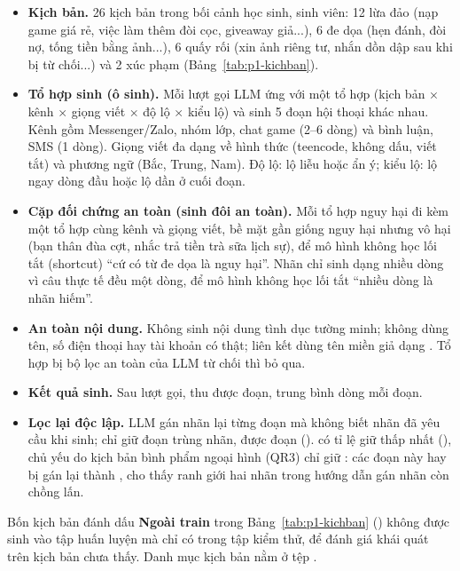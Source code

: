 \begin{itemize}
  \item \textbf{Kịch bản.} 26 kịch bản trong bối cảnh học sinh, sinh viên: 12 lừa đảo (nạp game giá
        rẻ, việc làm thêm đòi cọc, giveaway giả...), 6 đe dọa (hẹn đánh, đòi nợ, tống tiền bằng ảnh...),
        6 quấy rối (xin ảnh riêng tư, nhắn dồn dập sau khi bị từ chối...) và 2 xúc phạm
        (Bảng~\ref{tab:p1-kichban}).
  \item \textbf{Tổ hợp sinh (ô sinh).} Mỗi lượt gọi LLM ứng với một tổ hợp (kịch bản $\times$ kênh $\times$ giọng viết
        $\times$ độ lộ $\times$ kiểu lộ) và sinh 5 đoạn hội thoại khác nhau. Kênh gồm Messenger/Zalo, nhóm lớp,
        chat game (2--6 dòng) và bình luận, SMS (1 dòng). Giọng viết đa dạng về hình thức (teencode, không dấu, viết
        tắt) và phương ngữ (Bắc, Trung, Nam). Độ lộ: lộ liễu hoặc ẩn ý; kiểu lộ: lộ ngay dòng đầu hoặc lộ dần
        ở cuối đoạn.
  \item \textbf{Cặp đối chứng an toàn (sinh đôi an toàn).} Mỗi tổ hợp nguy hại đi kèm một tổ hợp  cùng
        kênh và giọng viết, bề mặt gần giống nguy hại nhưng vô hại (bạn thân đùa cợt, nhắc trả
        tiền trà sữa lịch sự), để mô hình không học lối tắt (shortcut) ``cứ có từ đe dọa là nguy hại''. Nhãn
         chỉ sinh dạng nhiều dòng vì câu  thực tế đều một dòng, để mô hình
        không học lối tắt ``nhiều dòng là nhãn hiếm''.
  \item \textbf{An toàn nội dung.} Không sinh nội dung tình dục tường minh; không dùng tên, số điện thoại hay tài khoản
        có thật; liên kết dùng tên miền giả dạng . Tổ hợp bị bộ lọc an toàn của LLM từ chối
        thì bỏ qua.
  \item \textbf{Kết quả sinh.} Sau  lượt gọi, thu được  đoạn, trung
        bình  dòng mỗi đoạn.
  \item \textbf{Lọc lại độc lập.} LLM gán nhãn lại từng đoạn mà không biết nhãn đã yêu cầu khi sinh; chỉ giữ
        đoạn trùng nhãn, được  đoạn ().  có tỉ lệ giữ thấp
        nhất (), chủ yếu do kịch bản bình phẩm ngoại hình (QR3) chỉ giữ :
        các đoạn này hay bị gán lại thành , cho thấy ranh giới hai nhãn trong hướng
        dẫn gán nhãn còn chồng lấn.
\end{itemize}

Bốn kịch bản đánh dấu \textbf{Ngoài train} trong Bảng~\ref{tab:p1-kichban} () không được sinh vào tập
huấn luyện mà chỉ có trong tập kiểm thử, để đánh giá khái quát trên kịch bản chưa thấy. Danh mục kịch bản nằm ở tệp .

